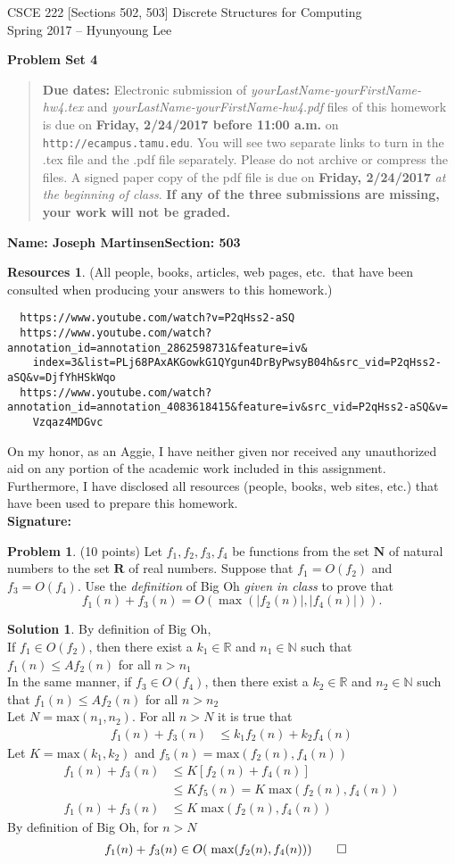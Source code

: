 \documentclass{article}
\theoremstyle{definition}
\newtheorem{problem}{Problem}
\newtheorem*{solution}{Solution}
\newtheorem*{resources}{Resources}
\newcommand{\name}[2]{\noindent\textbf{Name: #1}\hfill \textbf{Section: #2}}
\newcommand{\honor}{\noindent On my honor, as an Aggie, I have neither
  given nor received any unauthorized aid on any portion of the
  academic work included in this assignment. Furthermore, I have
  disclosed all resources (people, books, web sites, etc.) that have
  been used to prepare this homework. \\[2ex]
 \textbf{Signature:} \underline{\hspace*{10cm}} }
\newcommand{\problemset}[1]{\begin{center}\textbf{Problem Set #1}\end{center}}
\newcommand{\duedate}[2]{\begin{quote}\textbf{Due dates:} Electronic
    submission of \textsl{yourLastName-yourFirstName-hw4.tex} and 
    \textsl{yourLastName-yourFirstName-hw4.pdf} files of this homework is due on
    \textbf{#1} on \texttt{http://ecampus.tamu.edu}. You will see two separate links
    to turn in the .tex file and the .pdf file separately. Please do not archive or compress the files.  
    A signed paper copy of the pdf file is due on \textbf{#2} \textsl{at the beginning of class}.
    \textbf{If any of the three submissions are missing, your work will not be graded.}\end{quote} }
\newcommand{\N}{\mathbf{N}}
\newcommand{\R}{\mathbf{R}}
\begin{document}
\vspace*{-15mm}
\begin{center}
{\large
CSCE 222 [Sections 502, 503] Discrete Structures for Computing\\[.5ex]
Spring 2017 -- Hyunyoung Lee\\}
\end{center}
\problemset{4}
\duedate{Friday, 2/24/2017 before 11:00 a.m.}{Friday, 2/24/2017}
\name{Joseph Martinsen}{503}
\begin{resources} (All people, books, articles, web pages, etc.\ that
  have been consulted when producing your answers to this homework.) \\
  \begin{verbatim}
  https://www.youtube.com/watch?v=P2qHss2-aSQ
  https://www.youtube.com/watch?annotation_id=annotation_2862598731&feature=iv&
    index=3&list=PLj68PAxAKGowkG1QYgun4DrByPwsyB04h&src_vid=P2qHss2-aSQ&v=DjfYhHSkWqo
  https://www.youtube.com/watch?annotation_id=annotation_4083618415&feature=iv&src_vid=P2qHss2-aSQ&v=
    Vzqaz4MDGvc
    \end{verbatim}
\end{resources}
\honor

\smallskip

\begin{problem} (10 points)
Let $f_1, f_2, f_3, f_4$ be functions from the set $\N$ of natural numbers
to the set $\R$ of real numbers. Suppose that $f_1= O(f_2)$ and
$f_3=O(f_4)$. Use the \textit{definition} of Big Oh \textit{given in class} to prove that 
$$f_1(n) + f_3(n) = O(\max(|f_2(n)|,  |f_4(n)| ) ).$$
\end{problem}
\begin{solution}
By definition of Big Oh, \\
If $f_1 \in O(f_2)$, then there exist a $k_1 \in \mathbb{R}$ and $n_1 \in \mathbb{N}$ such that $f_1(n) \le Af_2(n)$ for all $n>n_1$\\
In the same manner, if $f_3 \in O(f_4)$, then there exist a $k_2 \in \mathbb{R}$ and $n_2 \in \mathbb{N}$ such that $f_1(n) \le Af_2(n)$ for all $n>n_2$ \\
Let $N = \text{max}(n_1,n_2)$. For all $n > N$ it is true that
\begin{align*}
  f_1(n) + f_3(n) &\le k_1 f_2(n) + k_2 f_4(n)
\end{align*}
Let $K = \text{max}(k_1,k_2)$ and $f_5(n) = \text{max}(f_2(n),f_4(n))$
\begin{align*}
  f_1(n) + f_3(n) &\le K[f_2(n) + f_4(n)] \\
  &\le K f_5(n) = K \;\text{max}(f_2(n),f_4(n)) \\
    f_1(n) + f_3(n) &\le K \;\text{max}(f_2(n),f_4(n))
\end{align*}
By definition of Big Oh, for $n > N$
\begin{align*}
  f_1(n) + f_3(n) &\in O( \;\text{max}(f_2(n),f_4(n))) \qed
\end{align*}
\end{solution}
\end{document}
